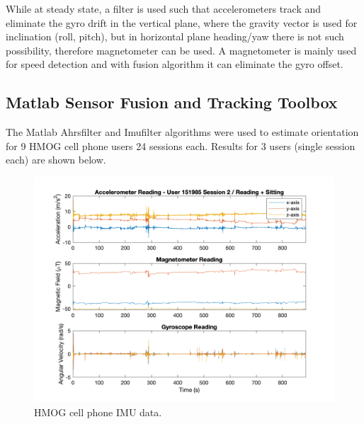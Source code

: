 \documentclass{article}
\begin{document}
While at steady state, a filter is used such that accelerometers track and eliminate the gyro drift in the vertical plane, where the gravity vector is used for inclination (roll, pitch), but in horizontal plane heading/yaw there is not such possibility, therefore magnetometer can be used. A magnetometer is mainly used for speed detection and with fusion algorithm it can eliminate the gyro offset.

\subsection{Matlab Sensor Fusion and Tracking Toolbox}

The Matlab Ahrsfilter and Imufilter algorithms were used to estimate orientation for 9 HMOG cell phone users 24 sessions each. Results for 3 users (single session each) are shown below.

\begin{figure}[ht] %
  \includegraphics[width=1\linewidth]{images/151985_2_acc_mag_gyr_data.png}
  \caption[]{HMOG cell phone IMU data.}
  \label{fig:151985_2_imu}
\end{figure}
\end{document}
